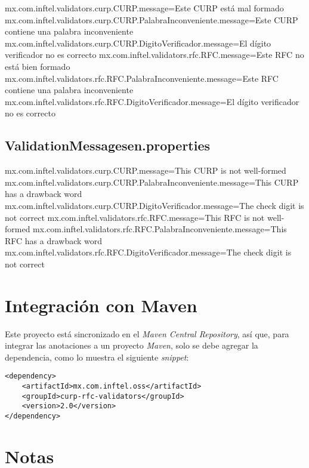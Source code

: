 \documentclass[12pt,letterpaper]{article}
\begin{document}
\scriptsize
\begin{listing}{1}
mx.com.inftel.validators.curp.CURP.message=Este CURP está mal formado
mx.com.inftel.validators.curp.CURP.PalabraInconveniente.message=Este CURP contiene una palabra inconveniente
mx.com.inftel.validators.curp.CURP.DigitoVerificador.message=El dígito verificador no es correcto
mx.com.inftel.validators.rfc.RFC.message=Este RFC no está bien formado
mx.com.inftel.validators.rfc.RFC.PalabraInconveniente.message=Este RFC contiene una palabra inconveniente
mx.com.inftel.validators.rfc.RFC.DigitoVerificador.message=El dígito verificador no es correcto
\end{listing}
\normalsize

\subsection{ValidationMessages\textunderscore{}en.properties}

\scriptsize
\begin{listing}{1}
mx.com.inftel.validators.curp.CURP.message=This CURP is not well-formed
mx.com.inftel.validators.curp.CURP.PalabraInconveniente.message=This CURP has a drawback word
mx.com.inftel.validators.curp.CURP.DigitoVerificador.message=The check digit is not correct
mx.com.inftel.validators.rfc.RFC.message=This RFC is not well-formed
mx.com.inftel.validators.rfc.RFC.PalabraInconveniente.message=This RFC has a drawback word
mx.com.inftel.validators.rfc.RFC.DigitoVerificador.message=The check digit is not correct
\end{listing}
\normalsize

\section{Integración con Maven}

Este proyecto está sincronizado en el \emph{Maven Central Repository}, así que,
para integrar las anotaciones a un proyecto \emph{Maven}, solo se debe agregar
la dependencia, como lo muestra el siguiente \emph{snippet}:

\begin{verbatim}
<dependency>
    <artifactId>mx.com.inftel.oss</artifactId>
    <groupId>curp-rfc-validators</groupId>
    <version>2.0</version>
</dependency>
\end{verbatim}

\section{Notas}
\end{document}
